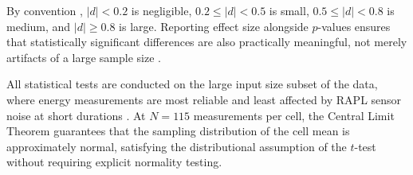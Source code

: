 By convention \cite{cohen1988}, $|d| < 0.2$ is negligible, $0.2 \leq |d| < 0.5$ is small, $0.5 \leq |d| < 0.8$ is medium, and $|d| \geq 0.8$ is large. Reporting effect size alongside $p$-values ensures that statistically significant differences are also practically meaningful, not merely artifacts of a large sample size \cite{cohen1988}.
 
All statistical tests are conducted on the large input size subset of the data, where energy measurements are most reliable and least affected by RAPL sensor noise at short durations \cite{10.1145/2425248.2425252}. At $N = 115$ measurements per cell, the Central Limit Theorem guarantees that the sampling distribution of the cell mean is approximately normal, satisfying the distributional assumption of the $t$-test without requiring explicit normality testing.
